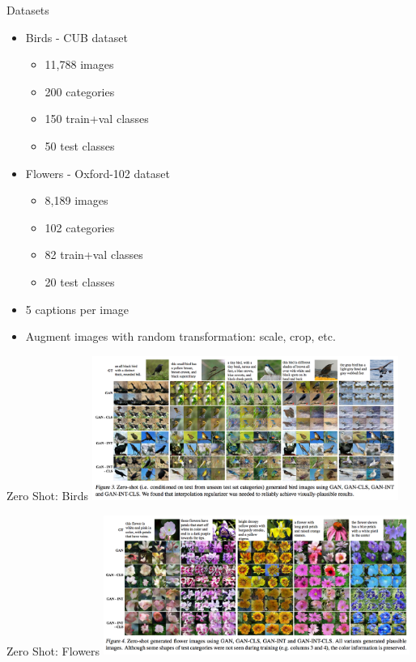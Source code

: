 \documentclass{beamer}
\begin{document}
\begin{frame}{Datasets}

\begin{itemize} %
\item Birds - CUB dataset
\begin{itemize}
\item 11,788 images
\item 200 categories
\item 150 train+val classes
\item 50 test classes
\end{itemize}

\item Flowers - Oxford-102 dataset
\begin{itemize}
\item 8,189 images
\item 102 categories
\item 82 train+val classes
\item 20 test classes
\end{itemize}

\item 5 captions per image
\item Augment images with random transformation: scale, crop, etc.

\end{itemize} %

\end{frame}


\begin{frame}{Zero Shot: Birds}
\centering
\includegraphics[width=10cm]{img/reed/zero_shot_birds.png}
\end{frame}


\begin{frame}{Zero Shot: Flowers}
\centering
\includegraphics[width=10cm]{img/reed/zero_shot_flowers.png}
\end{frame}
\end{document}
